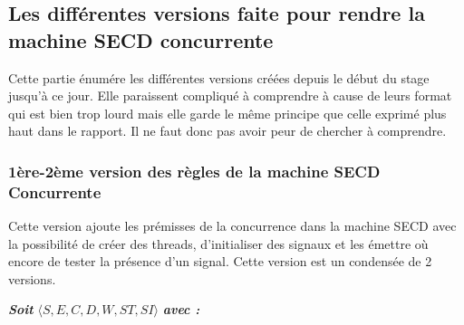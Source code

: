 \documentclass[10pt,a4paper]{report}
\begin{document}
\newpage



\subsection{Les différentes versions faite pour rendre la machine SECD concurrente}

Cette partie énumére les différentes versions créées depuis le début du stage jusqu'à ce jour. Elle paraissent compliqué à comprendre à cause de leurs format qui est bien trop lourd mais elle garde le même principe que celle exprimé plus haut dans le rapport. Il ne faut donc pas avoir peur de chercher à comprendre.

\subsubsection{1ère-2ème version des règles de la machine SECD Concurrente}\label{SECDConc1-2}
\smallbreak
Cette version ajoute les prémisses de la concurrence dans la machine SECD avec la possibilité de créer des threads, d'initialiser des signaux et les émettre où encore de tester la présence d'un signal. Cette version est un condensée de 2 versions.
\bigbreak

\textbf{\textit{Soit}} $\langle S,E,C,D,W,ST,SI\rangle$ \textbf{\textit{avec :}}
\end{document}
